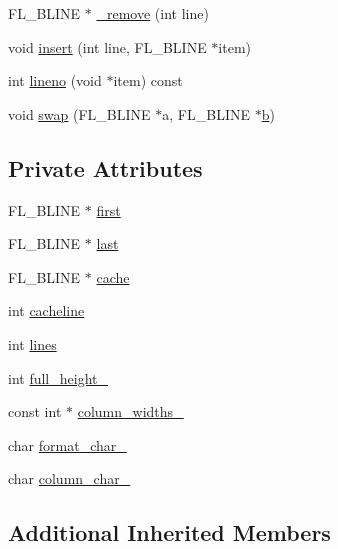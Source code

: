 \begin{DoxyCompactItemize}
\item 
F\+L\+\_\+\+B\+L\+I\+NE $\ast$ \hyperlink{class_fl___browser_af5fc9ac53bf1025f739868758240845f}{\+\_\+remove} (int line)
\item 
void \hyperlink{class_fl___browser_aba85896ae1a452e59f53e5de979deabf}{insert} (int line, F\+L\+\_\+\+B\+L\+I\+NE $\ast$item)
\item 
int \hyperlink{class_fl___browser_a16511721cb9fba104bc843f1d1589617}{lineno} (void $\ast$item) const
\item 
void \hyperlink{class_fl___browser_a0b0d76e4328ea9ca8dabc8f16d7c7a5b}{swap} (F\+L\+\_\+\+B\+L\+I\+NE $\ast$a, F\+L\+\_\+\+B\+L\+I\+NE $\ast$\hyperlink{forms_8_h_a0ba06a290a384fa06b1b90745827dae2}{b})
\end{DoxyCompactItemize}
\subsection*{Private Attributes}
\begin{DoxyCompactItemize}
\item 
F\+L\+\_\+\+B\+L\+I\+NE $\ast$ \hyperlink{class_fl___browser_a4b8df113b3c1833d0408ee7dfbd0fde8}{first}
\item 
F\+L\+\_\+\+B\+L\+I\+NE $\ast$ \hyperlink{class_fl___browser_a706c6aa6e8e999b06f196304035a6284}{last}
\item 
F\+L\+\_\+\+B\+L\+I\+NE $\ast$ \hyperlink{class_fl___browser_ac1e223beb3282fb60915aa63c877e012}{cache}
\item 
int \hyperlink{class_fl___browser_a9d50777de5e759b2ca4d08f86bd138fc}{cacheline}
\item 
int \hyperlink{class_fl___browser_a53301076494e6954244e0b6d373327b7}{lines}
\item 
int \hyperlink{class_fl___browser_a8816afc640fa716aaf1adb636a3c7425}{full\+\_\+height\+\_\+}
\item 
const int $\ast$ \hyperlink{class_fl___browser_a01af84e5a59cac0b15f853447d9678e2}{column\+\_\+widths\+\_\+}
\item 
char \hyperlink{class_fl___browser_a04a3b90fbc6cdc870250cd8466d95dfd}{format\+\_\+char\+\_\+}
\item 
char \hyperlink{class_fl___browser_aa0c734cf02b98e82131972008dfc033f}{column\+\_\+char\+\_\+}
\end{DoxyCompactItemize}
\subsection*{Additional Inherited Members}


